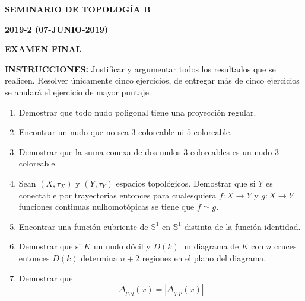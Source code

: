 \documentclass[12pts]{report}
\newcommand{\s}{\mathbb S}
\begin{document}
\begin{center}
\textbf{\LARGE {SEMINARIO DE TOPOLOGÍA B}}
\end{center}

\begin{center}
\textbf{{\large 2019-2 (07-JUNIO-2019)}}
\end{center}

\begin{center}
\textbf{{\large EXAMEN FINAL}}
\end{center}

{\bf INSTRUCCIONES:} Justificar y argumentar todos los resultados que se realicen. Resolver únicamente cinco ejercicios, de entregar más de cinco ejercicios se anulará el ejercicio de mayor puntaje.

\begin{enumerate}
\item Demostrar que todo nudo poligonal tiene una proyección regular.

\item Encontrar un nudo que no sea $3$-coloreable ni $5$-coloreable.

\item Demostrar que la suma conexa de dos nudos $3$-coloreables es un nudo $3$-coloreable.

\item Sean $(X,\tau_X)$ y $(Y,\tau_Y)$ espacios topológicos. Demostrar que si $Y$ es conectable por trayectorias entonces para cualesquiera $f: X \to Y$ y $g : X\to Y$ funciones continuas nulhomotópicas se tiene que $f\simeq g$.

\item Encontrar una función cubriente de $\s^1$ en $\s^1$ distinta de la función identidad.

\item Demostrar que si $K$ un nudo dócil y $D(k)$ un diagrama de $K$ con $n$ cruces entonces $D(k)$ determina $n+2$ regiones en el plano del diagrama.

\item Demostrar que 
$$\Delta_{p,q}(x)= |\Delta_{q,p}(x)|$$

\end{enumerate}
\end{document}
